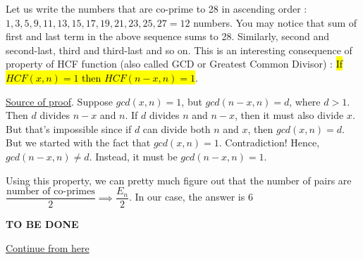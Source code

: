 
Let us write the numbers that are co-prime to 28 in ascending order : $1,3,5,9,11,13,15,17,19,21,23,25,27 = 12$ numbers. You may notice that sum of first and last term in the above sequence sums to 28. Similarly, second and second-last, third and third-last and so on. This is an interesting consequence of property of HCF function (also called GCD or Greatest Common Divisor) : \hl{If $HCF(x,n) = 1$ then $HCF(n-x,n) = 1$}. 

\begin{NOTE}
    \href{https://forthright48.com/sum-of-coprime-numbers-of-integer/}{Source of proof}. Suppose $gcd(x,n)=1$, but $gcd(n - x,n)=d$, where $d>1$. Then $d$ divides $n - x$ and $n$. If $d$ divides $n$ and $n - x$, then it must also divide $x$. But that’s impossible since if $d$ can divide both $n$ and $x$, then $gcd(x,n)=d$. But we started with the fact that $gcd(x,n)=1$. Contradiction! Hence, $gcd(n - x,n) \neq d$. Instead, it must be $gcd(n - x,n)=1$.
\end{NOTE}

Using this property, we can pretty much figure out that the number of pairs are $\dfrac{\text{number of co-primes}}{2} \implies \dfrac{E_n}{2}$. In our case, the answer is 6


\textbf{TO BE DONE}

\href{https://www.youtube.com/watch?v=BM4NMqu7qbc&list=PLG4bwc5fquzgmP5BLHrRDwBueer0udDjc&index=36}{Continue from here}